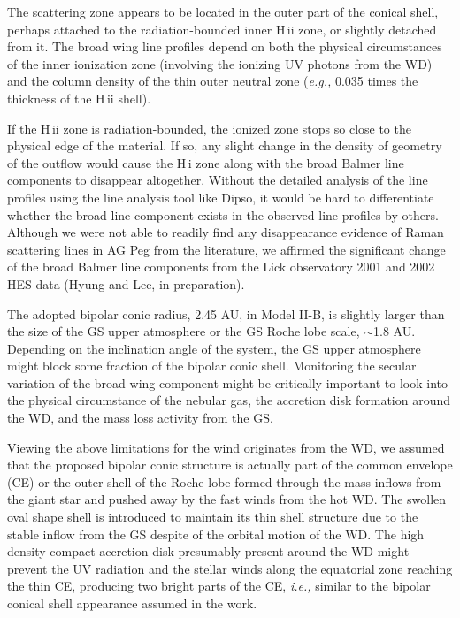 \documentclass[a4paper,fleqn,usenatbib,useAMS]{mnras}
\def\eg{{\it e.g.,} }
\def\ie{{\it i.e.,} }
\def\hi{H\,{\sc i}}
\def\hii{H\,{\sc ii}}
\begin{document}
{{The scattering zone appears to be located in the outer part of the conical shell, perhaps attached to the radiation-bounded inner {\hii} zone, or slightly detached from it. The broad wing line profiles depend on both the physical circumstances of the inner ionization zone (involving the ionizing UV photons from the WD) and the column density of the thin outer neutral zone (\eg 0.035 times the thickness of the {\hii} shell).

If the {\hii} zone is radiation-bounded, the ionized zone stops so close to the physical edge of the material. If so, any slight change in the density of geometry of the outflow would cause the {\hi} zone along with the broad Balmer line components to disappear altogether.
Without the detailed analysis of the line profiles using the line analysis tool like Dipso, it would be hard to differentiate whether the broad line component exists in the observed line profiles by others.
Although we were not able to readily find any disappearance evidence of Raman scattering lines in AG Peg from the literature, we affirmed the significant change of the broad Balmer line components from the Lick observatory 2001 and 2002 HES data (Hyung and Lee, in preparation).


The adopted bipolar conic radius, 2.45 AU, in Model II-B, is slightly larger than the size of the GS upper atmosphere or the GS Roche lobe scale, $\sim$1.8 AU.
Depending on the inclination angle of the system, the GS upper atmosphere might block some fraction of the bipolar conic shell.  Monitoring the secular variation of the broad wing component might be critically important to look into the physical circumstance of the nebular gas, the accretion disk formation around the WD, and the mass loss activity from the GS.



Viewing the above limitations for the wind originates from the WD, we assumed that the proposed bipolar conic structure is actually part of the common envelope (CE) or the outer shell of the Roche lobe formed through the mass inflows from the giant star and pushed away by the fast winds from the hot WD. The swollen oval shape shell is introduced to maintain its thin shell structure due to the stable inflow from the GS despite of the orbital motion of the WD. The  high density compact accretion disk presumably present around the WD might prevent the UV radiation and the stellar winds along the equatorial zone reaching the thin CE, producing two bright parts of the CE, \ie similar to the bipolar conical shell appearance assumed in the work.


}}
\end{document}
